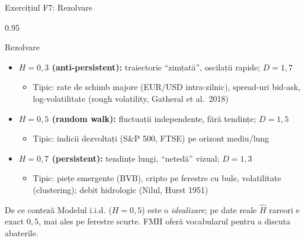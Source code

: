 \documentclass[9pt, aspectratio=169, t]{beamer}
\begin{document}
\begin{frame}[shrink=25]{Exercițiul F7: Rezolvare}
\begin{cminipage}{0.95\textwidth}
\begin{exampleblock}{Rezolvare}
\begin{itemize}\setlength{\itemsep}{0pt}
    \item \textbf{$H = 0{,}3$ (anti-persistent):} traiectorie ``zimțată'', oscilații rapide; $D = 1{,}7$
    \begin{itemize}\setlength{\itemsep}{0pt}
        \item Tipic: rate de schimb majore (EUR/USD intra-zilnic), spread-uri bid-ask, log-volatilitate (rough volatility, Gatheral et al.\ 2018)
    \end{itemize}
    \item \textbf{$H = 0{,}5$ (random walk):} fluctuații independente, fără tendințe; $D = 1{,}5$
    \begin{itemize}\setlength{\itemsep}{0pt}
        \item Tipic: indicii dezvoltați (S\&P 500, FTSE) pe orizont mediu/lung
    \end{itemize}
    \item \textbf{$H = 0{,}7$ (persistent):} tendințe lungi, ``netedă'' vizual; $D = 1{,}3$
    \begin{itemize}\setlength{\itemsep}{0pt}
        \item Tipic: piețe emergente (BVB), cripto pe ferestre cu bule, volatilitate (clustering); debit hidrologic (Nilul, Hurst 1951)
    \end{itemize}
\end{itemize}
\end{exampleblock}
\begin{alertblock}{De ce conteză}
Modelul i.i.d. ($H = 0{,}5$) este o \emph{idealizare}; pe date reale $\hat H$ rareori e exact $0{,}5$, mai ales pe ferestre scurte. FMH oferă vocabularul pentru a discuta abaterile.
\end{alertblock}
\end{cminipage}
\end{frame}
\end{document}
